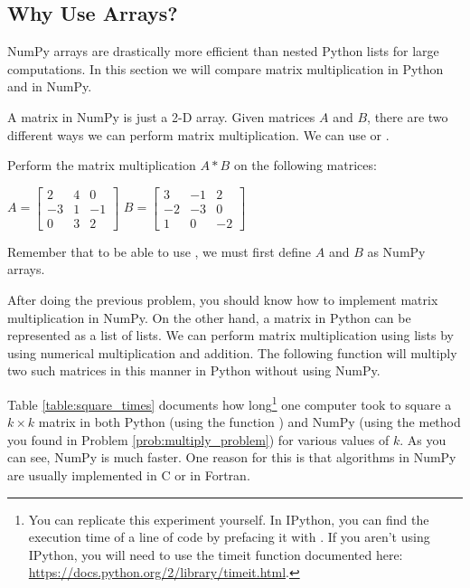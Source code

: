 \subsection*{Why Use Arrays?}
NumPy arrays are drastically more efficient than nested Python lists for large computations. 
In this section we will compare matrix multiplication in Python and in NumPy.

\begin{problem}
A matrix in NumPy is just a 2-D array. Given matrices $A$ and $B$, there are two different ways we can perform matrix multiplication. We can use  or . 

Perform the matrix multiplication $A * B$ on the following matrices:
\begin{center}
$A = \begin{bmatrix} 2&4&0 \\ -3&1&-1 \\ 0&3&2 \end{bmatrix}$
$B = \begin{bmatrix} 3&-1&2 \\ -2&-3&0 \\ 1&0&-2 \end{bmatrix}$
\end{center}
Remember that to be able to use , we must first define $A$ and $B$ as NumPy arrays.
\label{prob:multiply_problem}
\end{problem}




After doing the previous problem, you should know how to implement matrix multiplication in NumPy. 
On the other hand, a matrix in Python can be represented as a list of lists.  We can perform matrix multiplication using lists by using numerical multiplication and addition. 
The following function will multiply two such matrices in this manner in Python without using NumPy.



Table \ref{table:square_times} documents how long\footnote{You can replicate this experiment yourself. In IPython, you can find the execution time of a line of code by prefacing it with . 
If you aren't using IPython, you will need
to use the timeit function documented here: \url{https://docs.python.org/2/library/timeit.html}.} 
one computer took to square a $k \times k$ matrix in both Python (using the function ) and NumPy (using the method you found in Problem \ref{prob:multiply_problem}) for various values of $k$. 
As you can see, NumPy is much faster. One reason for this is that algorithms in NumPy are usually implemented in C or in Fortran. 

